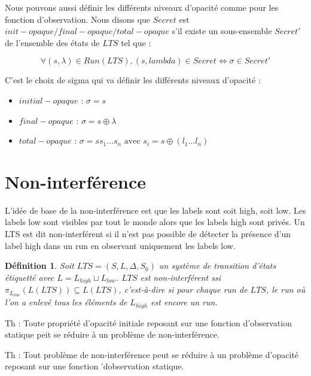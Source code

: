 \documentclass[10pt,a4paper]{article}
\newtheorem {mydef} {D\'efinition}
\begin{document}
Nous pouvons aussi d\'efinir les diff\'erents niveaux d'opacit\'e comme pour les fonction d'observation. Nous disons que $Secret$ est $init-opaque/final-opaque/total-opaque$ s'il existe un sous-ensemble  $Secret'$ de l'ensemble des \'etats de $LTS$ tel que :

$$\forall (s,\lambda) \in Run(LTS), (s,lambda) \in Secret \Leftrightarrow \sigma \in Secret'$$

C'est le choix de sigma qui va d\'efinir les diff\'erents niveaux d'opacit\'e :

\begin{itemize}
	\item $initial-opaque$ : $\sigma = s$
	\item $final-opaque$ : $\sigma = s\oplus \lambda$
	\item $total-opaque$ : $\sigma = s s_1 \dots s_n \mbox{ avec } s_i = s\oplus(l_1\dots l_n)$
\end{itemize} 

\section{Non-interf\'erence}

L'id\'ee de base de la non-interf\'erence est que les labels sont soit high, soit low. Les labels low sont visibles par tout le monde alors que les labels high sont priv\'es. Un LTS est dit non-interf\'erent si il n'est pas possible de d\'etecter la pr\'esence d'un label high dans un run en observant uniquement les labels low.

\begin{mydef}
  Soit $LTS = (S,L,\Delta,S_0)$ un syst\`eme de transition d'\'etats \'etiquett\'e avec $L=L_{high}\sqcup L_{low}$. $LTS$ est non-interf\'erent ssi $\pi_{L_{low}}(L(LTS)) \subseteq L(LTS)$, c'est-\`a-dire si pour chaque run de $LTS$, le run o\`u l'on a enlev\'e tous les \'el\'ements de $L_{high}$ est encore un run.
\end{mydef}

Th : Toute propri\'et\'e d'opacit\'e initiale reposant sur une fonction d'observation statique peit se r\'eduire \`a un probl\`eme  de non-interf\'erence.

Th : Tout probl\`eme de non-interf\'erence peut se r\'eduire \`a un probl\`eme d'opacit\'e reposant sur une fonction 'dobservation statique.
\end{document}

